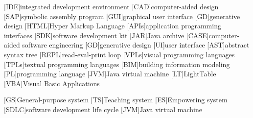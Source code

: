 
% 
% 

\begin{acronym}

[IDE]{integrated development environment}
[CAD]{computer-aided design}
[SAP]{symbolic assembly program}
[GUI]{graphical user interface}
[GD]{generative design}
[HTML]{Hyper Markup Language}
[APIs]{application programming interfaces}
[SDK]{software development kit}
[JAR]{Java archive}
[CASE]{computer-aided software engineering}
[GD]{generative design}
[UI]{user interface}
[AST]{abstract syntax tree}
[REPL]{read-eval-print loop}
[VPLs]{visual programming languages}
[TPLs]{textual programming languages}
[BIM]{building information modeling}
[PL]{programming language}
[JVM]{Java virtual machine}
[LT]{LightTable}
[VBA]{Visual Basic Applications}

[GS]{General-purpose system}
[TS]{Teaching system}
[ES]{Empowering system}
[SDLC]{software development life cycle}
[JVM]{Java virtual machine}
\end{acronym}